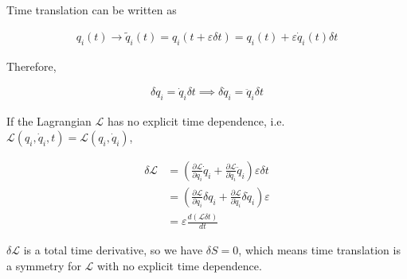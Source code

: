 \documentclass[12pt]{book} %
\numberwithin{equation}{chapter}
\def\d{\delta}
\def\e{\varepsilon}
\def\La{\mathcal{L}}
\def\p{\partial}
\begin{document}
\begin{example}
Time translation can be written as
\begin{eqnbox}
\begin{align}
q_{i}(t)\to\tilde{q}_{i}(t)=q_{i}(t+\e\d t)=q_{i}(t)+\e \dot{q}_{i}(t)\d t
\end{align}
\end{eqnbox}
Therefore,
\begin{eqnbox}
\begin{align}
\d q_{i}=\dot{q}_{i}\d t\implies \d \dot{q}_{i}=\ddot{q}_{i}\d t
\end{align}
\end{eqnbox}
If the Lagrangian $\La$ has no explicit time dependence, i.e. $\La(q_{i}, \dot{q}_{i}, t)=\La(q_{i}, \dot{q}_{i})$, 
\begin{eqnbox}
\begin{align}
\d \La&=\left(\frac{\p \La}{\p q_{i}}\dot{q}_{i}+\frac{\p \La}{\p \dot{q}_{i}}\ddot{q}_{i}\right)\e\d t\nonumber\\
&=\left(\frac{\p \La}{\p q_{i}}\d q_{i}+\frac{\p \La}{\p \dot{q}_{i}}\d \dot{q}_{i}\right)\e\nonumber\\
&=\e\frac{d\left(\La\d t\right)}{dt}
\end{align}
\end{eqnbox}
$\d \La$ is a total time derivative, so we have $\d S=0$, which means time translation is a symmetry for $\La$ with no explicit time dependence.
\end{example}
\end{document}
